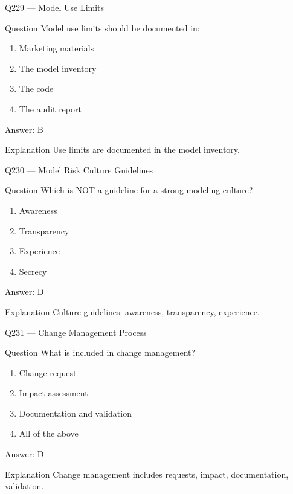 \documentclass[aspectratio=169,8pt]{beamer}
\begin{document}
\begin{frame}{Q229 --- Model Use Limits}
\begin{block}{Question}
Model use limits should be documented in:
\begin{enumerate}
\item Marketing materials
\item The model inventory
\item The code
\item The audit report
\end{enumerate}
\end{block}
\begin{exampleblock}{Answer: B}\end{exampleblock}
\begin{block}{Explanation}
Use limits are documented in the model inventory.
\end{block}
\end{frame}

\begin{frame}{Q230 --- Model Risk Culture Guidelines}
\begin{block}{Question}
Which is NOT a guideline for a strong modeling culture?
\begin{enumerate}
\item Awareness
\item Transparency
\item Experience
\item Secrecy
\end{enumerate}
\end{block}
\begin{exampleblock}{Answer: D}\end{exampleblock}
\begin{block}{Explanation}
Culture guidelines: awareness, transparency, experience.
\end{block}
\end{frame}

\begin{frame}{Q231 --- Change Management Process}
\begin{block}{Question}
What is included in change management?
\begin{enumerate}
\item Change request
\item Impact assessment
\item Documentation and validation
\item All of the above
\end{enumerate}
\end{block}
\begin{exampleblock}{Answer: D}\end{exampleblock}
\begin{block}{Explanation}
Change management includes requests, impact, documentation, validation.
\end{block}
\end{frame}
\end{document}
